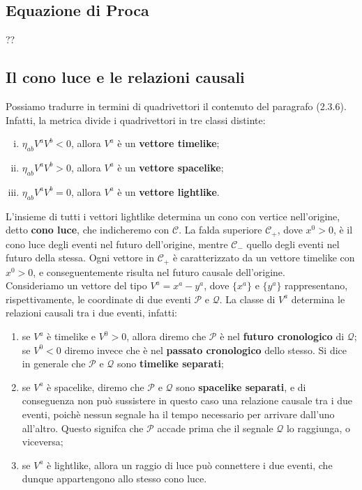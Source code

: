 \documentclass[a4paper,11pt]{book}
\theoremstyle{plain}
\theoremstyle{definition}
\begin{document}
\subsection{Equazione di Proca}
??

\subsection{Il cono luce e le relazioni causali}
Possiamo tradurre in termini di quadrivettori il contenuto del paragrafo (2.3.6). Infatti, la metrica divide i quadrivettori in tre classi distinte:
\begin{enumerate}[i.]
	\item $\eta_{ab}V^aV^b<0$, allora $V^a$ è un \textbf{vettore timelike};
	\item $\eta_{ab}V^aV^b > 0$, allora $V^a$ è un \textbf{vettore spacelike};
	\item $\eta_{ab}V^aV^b = 0$, allora $V^a$ è un \textbf{vettore lightlike}.
\end{enumerate}
L'insieme di tutti i vettori lightlike determina un cono con vertice nell'origine, detto \textbf{cono luce}, che indicheremo con $\mathcal{C}$. La falda superiore $\mathcal{C}_+$, dove $x^0>0$, è il cono luce degli eventi nel futuro dell'origine, mentre $\mathcal{C}_-$ quello degli eventi nel futuro della stessa. Ogni vettore in $\mathcal{C}_+$ è caratterizzato da un vettore timelike con $x^0>0$, e conseguentemente risulta nel futuro causale dell'origine. 
\\
Consideriamo un vettore del tipo $V^a=x^a-y^a$, dove $\{x^a\}$ e $\{y^a\}$ rappresentano, rispettivamente, le coordinate di due eventi $\mathcal{P}$ e $\mathcal{Q}$. La classe di $V^a$ determina le relazioni causali tra i due eventi, infatti:
\begin{enumerate}
	\item se $V^a$ è timelike e $V^0>0$, allora diremo che $\mathcal{P}$ è nel \textbf{futuro cronologico} di $\mathcal{Q}$; se $V^0<0$ diremo invece che è nel \textbf{passato cronologico} dello stesso. Si dice in generale che $\mathcal{P}$ e $\mathcal{Q}$ sono \textbf{timelike separati};
	\item se $V^a$ è spacelike, diremo che $\mathcal{P}$ e $\mathcal{Q}$ sono \textbf{spacelike separati}, e di conseguenza non può sussistere in questo caso una relazione causale tra i due eventi, poichè nessun segnale ha il tempo necessario per arrivare dall'uno all'altro. Questo signifca che $\mathcal{P}$ accade prima che il segnale $\mathcal{Q}$ lo raggiunga, o viceversa;
	\item se $V^a$ è lightlike, allora un raggio di luce può connettere i due eventi, che dunque appartengono allo stesso cono luce. 		
\end{enumerate}
\end{document}

